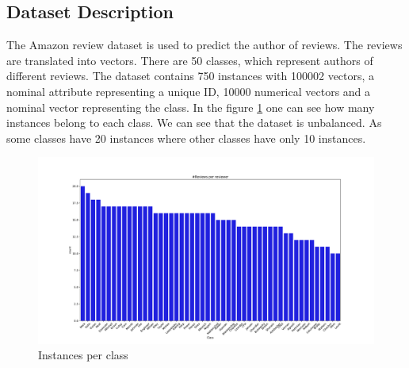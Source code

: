 \documentclass[11pt]{article}
\begin{document}
\subsection{Dataset Description} 
The Amazon review dataset is used to predict the author of reviews. The reviews are translated into vectors. There are 50 classes, which represent authors of different reviews. The dataset contains 750 instances with 100002 vectors, a nominal attribute representing a unique ID, 10000 numerical vectors and a nominal vector representing the class.
\newline 
In the figure \ref{Fig::Instances_per_class} one can see how many instances belong to each class. We can see that the dataset is unbalanced. As some classes have 20 instances where other classes have only 10 instances.
%
\begin{figure}[h]
\begin{minipage}[t]{0.8\textwidth}
\includegraphics[width=1.0\linewidth]{amazon/Instances_per_class.pdf}
\end{minipage}
\caption{Instances per class}
\label{Fig::Instances_per_class}
\end{figure}
%
\end{document}
